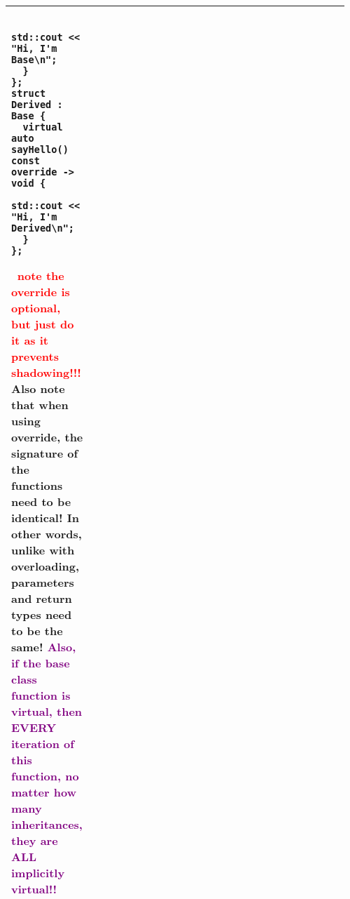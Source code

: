 \documentclass[main.tex,fontsize=8pt,paper=a4,paper=portrait,DIV=calc,]{scrartcl}
\begin{document}
\begin{table}[ht!]
\begin{tabular}{|m{0.2\linewidth}|m{0.755\linewidth}|}
\begin{lstlisting}
    std::cout << "Hi, I'm Base\n";
  }
};
struct Derived : Base {
  virtual auto sayHello() const override -> void {
    std::cout << "Hi, I'm Derived\n";
  } 
};
\end{lstlisting}
\, \newline
\textcolor{red}{note the override is optional, but just do it as it prevents shadowing!!!}\newline
Also note that when using override, the signature of the functions need to be identical! In other words, unlike with overloading, parameters and return types need to be the same!\newline
\textcolor{purple}{Also, if the \textbf{base class function is virtual, then EVERY iteration of this function, no matter how many inheritances, they are ALL implicitly virtual!!}}
\\
\hline
\end{tabular}
\end{table}
\pagebreak
\end{document}
